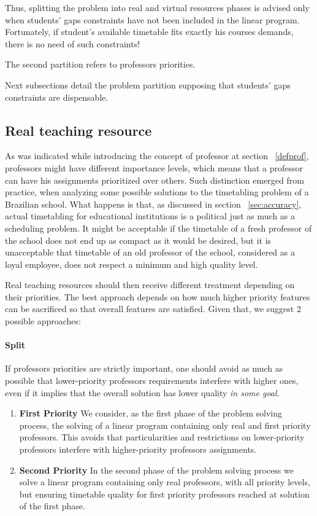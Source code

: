 Thus, splitting the problem into real and virtual resources phases is advised only when students' gaps constraints have not been included in the linear program. Fortunately, if student's available timetable fits exactly his courses demands, there is no need of such constraints!

The second partition refers to professors priorities.

Next subsections detail the problem partition supposing that students' gaps constraints are dispensable.

\subsection{Real teaching resource}

As was indicated while introducing the concept of professor at section ~\ref{defprof}, professors might have different importance levels, which means that a professor can have his assignments prioritized over others. Such distinction emerged from practice, when analyzing some possible solutions to the timetabling problem of a Brazilian school. What happens is that, as discussed in section ~\ref{sec:accuracy}, actual timetabling for educational institutions is a political just as much as a scheduling problem. It might be acceptable if the timetable of a fresh professor of the school does not end up as compact as it would be desired, but it is unacceptable that timetable of an old professor of the school, considered as a loyal employee, does not respect a minimum and high quality level.

Real teaching resources should then receive different treatment depending on their priorities. The best approach depends on how much higher priority features can be sacrificed so that overall features are satisfied. Given that, we suggest 2 possible approaches:

\paragraph{Split}
If professors priorities are strictly important, one should avoid as much as possible that lower-priority professors requirements interfere with higher ones, even if it implies that the overall solution has lower quality \textit{in some goal}.
\begin{enumerate}
\item \textbf{First Priority}
We consider, as the first phase of the problem solving process, the solving of a linear program containing only real and first priority professors. This avoids that particularities and restrictions on lower-priority professors interfere with higher-priority professors assignments.
\item \textbf{Second Priority}
In the second phase of the problem solving process we solve a linear program containing only real professors, with all priority levels, but ensuring timetable quality for first priority professors reached at solution of the first phase.
\end{enumerate}
